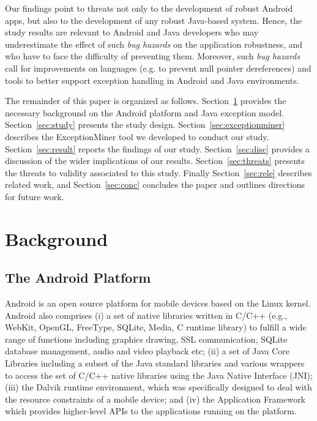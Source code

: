 \documentclass[conference]{IEEEtran}
\begin{document}
Our findings point to threats not only to the development of robust Android apps, 
but also to the development of any robust Java-based system. 
Hence, the study results are relevant to Android and Java developers who may underestimate the effect of such
 \emph{bug hazards} on the application robustness,
and who have to face the difficulty of preventing them.
Moreover, such \emph{bug hazards} 
call for improvements on languages (e.g. to prevent null pointer dereferences) and tools to better support exception handling in Android and Java environments.

The remainder of this paper is organized as follows. 
Section~\ref{sec:back} provides the necessary
background on the Android platform and Java exception model. 
Section~\ref{sec:study} presents the study design. 
Section~\ref{sec:exceptionminer} describes the ExceptionMiner tool we developed to conduct our study.
Section~\ref{sec:result} reports the findings of our study.
Section~\ref{sec:disc} provides a discussion of the wider implications of our results.
Section~\ref{sec:threats} presents the threats to validity associated to this study. 
Finally Section~\ref{sec:rele} describes related work, 
and Section~\ref{sec:conc} concludes the paper and outlines
directions for future work.

\section{Background}
\label{sec:back}

\subsection{The Android Platform}
Android is an open source platform for mobile devices based on the Linux kernel.
Android also comprises (i) a set of native libraries written in C/C++ 
(e.g., WebKit, OpenGL, FreeType, SQLite, Media, C runtime library) to
fulfill a wide range of functions including graphics drawing, SSL communication, 
SQLite database management, audio and video playback etc; (ii) a set of Java Core Libraries 
including a subset of the Java standard libraries and various wrappers to access the set of C/C++ 
native libraries using the Java Native Interface (JNI); (iii) the Dalvik runtime environment, which was specifically designed to deal with the resource constraints of a mobile device; 
 and (iv) the Application Framework which provides higher-level APIs to the applications
 running on the platform.
\end{document}
